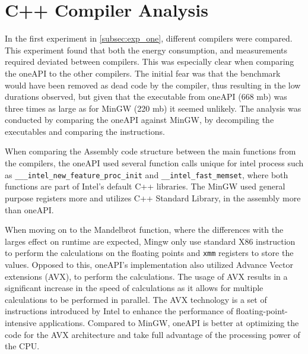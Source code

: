 \section{C++ Compiler Analysis}\label{app:compiler-analysis}

In the first experiment in \cref{subsec:exp_one}, different compilers were compared. This experiment found that both the energy consumption, and measurements required deviated between compilers. This was especially clear when comparing the oneAPI to the other compilers. The initial fear was that the benchmark would have been removed as dead code by the compiler, thus resulting in the low durations observed, but given that the executable from oneAPI (668 mb) was three times as large as for MinGW (220 mb) it seemed unlikely. The analysis was conducted by comparing the oneAPI against MinGW, by decompiling the executables and comparing the instructions.

When comparing the Assembly code structure between the main functions from the compilers, the oneAPI used several function calls unique for intel process such as \texttt{\_\_\_intel\_new\_feature\_proc\_init} and \texttt{\_\_intel\_fast\_memset}, where both functions are part of Intel's default C++ libraries\cite{Intelassembly}. The MinGW used general purpose registers more and utilizes C++ Standard Library, in the assembly more than oneAPI.




When moving on to the Mandelbrot function, where the differences with the larges effect on runtime are expected, Mingw only use standard X86 instruction\cite{X86} to perform the calculations on the floating points and \texttt{xmm} registers to store the values. Opposed to this, oneAPI's implementation also utilized Advance Vector extensions (AVX)\cite{AVXIntel}, to perform the calculations. The usage of AVX results in a significant increase in the speed of calculations as it allows for multiple calculations to be performed in parallel. The AVX technology is a set of instructions introduced by Intel to enhance the performance of floating-point-intensive applications\cite{AVXIntel}. Compared to MinGW, oneAPI is better at optimizing the code for the AVX architecture and take full advantage of the processing power of the CPU. 

